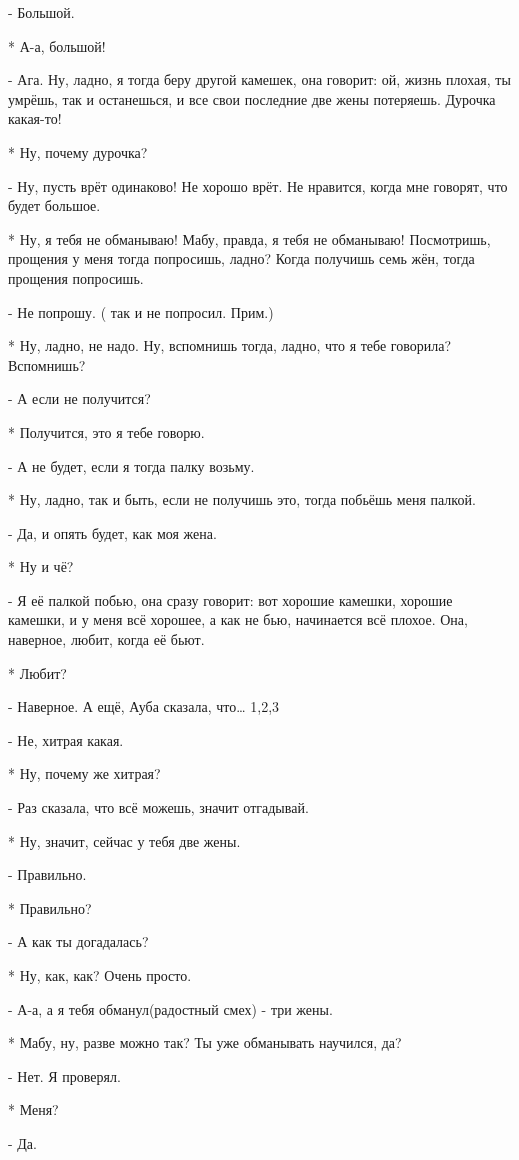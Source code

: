 - Большой.

* А-а, большой!

- Ага. Ну, ладно, я тогда беру другой камешек, она говорит: ой, жизнь плохая, ты умрёшь, так и останешься, и все свои последние две жены  потеряешь. Дурочка какая-то!

* Ну, почему дурочка?

- Ну, пусть врёт одинаково! Не хорошо врёт. Не нравится, когда мне говорят, что будет большое.

* Ну, я тебя не обманываю! Мабу, правда, я тебя не обманываю! Посмотришь, прощения у меня тогда попросишь, ладно? Когда получишь семь жён, тогда прощения попросишь.

- Не попрошу. ( так и не попросил. Прим.)

* Ну, ладно, не надо. Ну, вспомнишь тогда, ладно, что я тебе говорила? Вспомнишь?

- А если не получится?

* Получится, это я тебе говорю.

- А не будет, если я тогда палку возьму.

* Ну, ладно, так и быть, если не получишь это, тогда побьёшь меня палкой.

- Да, и опять будет, как моя жена.

* Ну и чё?


- Я её палкой побью, она сразу говорит: вот хорошие камешки, хорошие камешки, и у меня всё хорошее, а как не бью, начинается всё плохое. Она, наверное, любит, когда её бьют.

* Любит?

- Наверное. А ещё, Ауба сказала, что…
 1,2,3

- Не, хитрая какая.

* Ну, почему же хитрая?

- Раз сказала, что всё можешь, значит отгадывай.

* Ну, значит, сейчас у тебя две жены.

- Правильно.

* Правильно?

- А как ты догадалась?

* Ну, как, как? Очень просто.

- А-а, а я тебя обманул(радостный смех) - три жены.

* Мабу, ну, разве можно так? Ты уже обманывать научился, да?

- Нет. Я проверял.

* Меня?

- Да.

